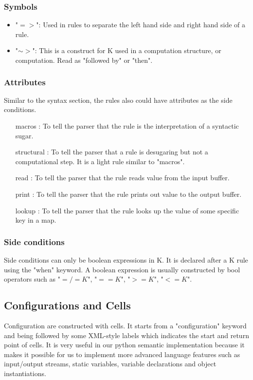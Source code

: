 \documentclass[a4paper]{article}
\begin{document}
\subsubsection{Symbols}
\begin{itemize}
    \item "$=>$": Used in rules to separate the left hand side and right hand side of a rule.
    \item "$\sim>$": This is a construct for K used in a computation structure, or computation. Read as "followed by" or "then". 
\end{itemize}
\subsubsection{Attributes}
Similar to the syntax section, the rules also could have attributes as the side conditions. 
\begin{itemize}
    \item [macros]: To tell the parser that the rule is the interpretation of a syntactic sugar.
    \item [structural]: To tell the parser that a rule is desugaring but not a computational step. It is a light rule similar to "macros".
    \item [read]: To tell the parser that the rule reads value from the input buffer.
    \item [print]: To tell the parser that the rule prints out value to the output buffer.
    \item [lookup]: To tell the parser that the rule looks up the value of some specific key in a map.
\end{itemize}
\subsubsection{Side conditions}
Side conditions can only be boolean expressions in K. It is declared after a K rule using the "when" keyword. A boolean expression is usually constructed by bool operators such as "$=/=K$", 
"$==K$", "$>=K$", "$<=K$".

\subsection{Configurations and Cells}
Configuration are constructed with cells. It starts from a "configuration" keyword and being followed by some XML-style labels which indicates the start and return point of cells. It is very useful in our python semantic implementation because it makes it possible for us to implement more advanced language features such as input/output streams, static variables, variable declarations and object instantiations.
\end{document}
